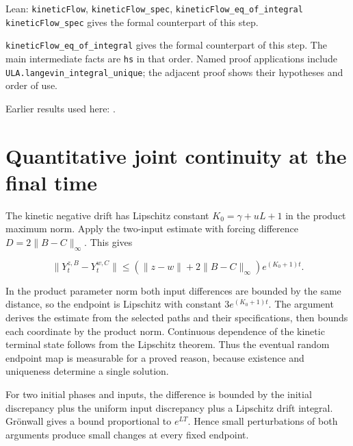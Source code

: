\documentclass[11pt,a4paper]{article}
\begin{document}
\begin{leanbox}{Lean: \texttt{kineticFlow}, \texttt{kineticFlow\_\allowbreak{}spec}, \texttt{kineticFlow\_\allowbreak{}eq\_\allowbreak{}of\_\allowbreak{}integral}}
\texttt{kinetic\allowbreak{}Flow\_\allowbreak{}spec} gives the formal counterpart of this step.




\texttt{kinetic\allowbreak{}Flow\_\allowbreak{}eq\_\allowbreak{}of\_\allowbreak{}integral} gives the formal counterpart of this step. The main intermediate facts are \texttt{hs} in that order. Named proof applications include \texttt{ULA.\allowbreak{}langevin\_\allowbreak{}integral\_\allowbreak{}unique}; the adjacent proof shows their hypotheses and order of use.
\end{leanbox}


Earlier results used here: \cite[Section~3.43.2]{LangevinLean2026ULASC}.

\section{\texorpdfstring{Quantitative joint continuity at the final time}{Quantitative joint continuity at the final time}}


The kinetic negative drift has Lipschitz constant \(K_0=\gamma+uL+1\) in the product maximum norm. Apply the two-input estimate with forcing difference \(D=2\|B-C\|_\infty\). This gives

\[\|Y_t^{z,B}-Y_t^{w,C}\|\le(\|z-w\|+2\|B-C\|_\infty)e^{(K_0+1)t}.\]

In the product parameter norm both input differences are bounded by the same distance, so the endpoint is Lipschitz with constant \(3e^{(K_0+1)t}\). The argument derives the estimate from the selected paths and their specifications, then bounds each coordinate by the product norm. Continuous dependence of the kinetic terminal state follows from the Lipschitz theorem. Thus the eventual random endpoint map is measurable for a proved reason, because existence and uniqueness determine a single solution.



For two initial phases and inputs, the difference is bounded by the initial discrepancy plus the uniform input discrepancy plus a Lipschitz drift integral. Grönwall gives a bound proportional to \(e^{LT}\). Hence small perturbations of both arguments produce small changes at every fixed endpoint.
\end{document}

